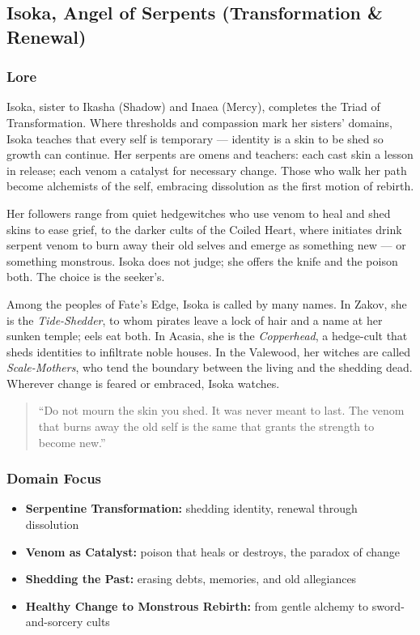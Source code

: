 
\subsection{Isoka, Angel of Serpents (Transformation \& Renewal)}

\subsubsection*{Lore}
Isoka, sister to Ikasha (Shadow) and Inaea (Mercy), completes the Triad of Transformation. Where thresholds and compassion mark her sisters' domains, Isoka teaches that every self is temporary --- identity is a skin to be shed so growth can continue. Her serpents are omens and teachers: each cast skin a lesson in release; each venom a catalyst for necessary change. Those who walk her path become alchemists of the self, embracing dissolution as the first motion of rebirth.

Her followers range from quiet hedgewitches who use venom to heal and shed skins to ease grief, to the darker cults of the Coiled Heart, where initiates drink serpent venom to burn away their old selves and emerge as something new --- or something monstrous. Isoka does not judge; she offers the knife and the poison both. The choice is the seeker's.

Among the peoples of Fate's Edge, Isoka is called by many names. In Zakov, she is the \textit{Tide-Shedder}, to whom pirates leave a lock of hair and a name at her sunken temple; eels eat both. In Acasia, she is the \textit{Copperhead}, a hedge-cult that sheds identities to infiltrate noble houses. In the Valewood, her witches are called \textit{Scale-Mothers}, who tend the boundary between the living and the shedding dead. Wherever change is feared or embraced, Isoka watches.

\begin{quote}
``Do not mourn the skin you shed. It was never meant to last. The venom that burns away the old self is the same that grants the strength to become new.''
\end{quote}

\subsubsection*{Domain Focus}
\begin{itemize}
  \item \textbf{Serpentine Transformation:} shedding identity, renewal through dissolution
  \item \textbf{Venom as Catalyst:} poison that heals or destroys, the paradox of change
  \item \textbf{Shedding the Past:} erasing debts, memories, and old allegiances
  \item \textbf{Healthy Change to Monstrous Rebirth:} from gentle alchemy to sword-and-sorcery cults
\end{itemize}

